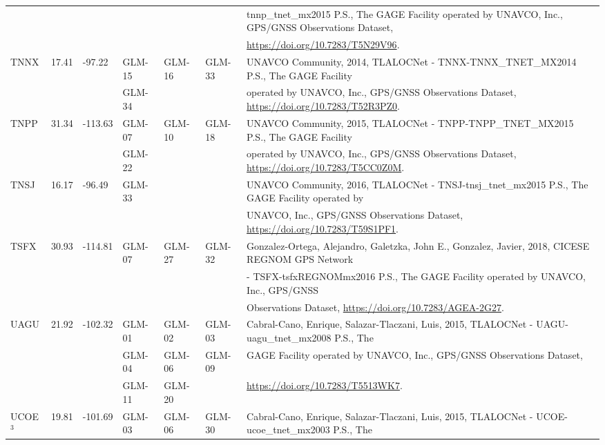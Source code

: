 \begin{landscape}
\begin{longtable}{llllllp{12cm}}
    &&&&&& tnnp\_tnet\_mx2015 P.S., The GAGE Facility operated by UNAVCO, Inc., GPS/GNSS Observations Dataset, \\
    &&&&&& \url{https://doi.org/10.7283/T5N29V96}. \\\hline
    \multirow{2}{*}{TNNX} & \multirow{2}{*}{17.41} & \multirow{2}{*}{-97.22} & GLM-15 & GLM-16 & GLM-33  & UNAVCO Community, 2014, TLALOCNet - TNNX-TNNX\_TNET\_MX2014 P.S., The GAGE Facility \\
    &&& GLM-34 &&& operated by UNAVCO, Inc., GPS/GNSS Observations Dataset, \url{https://doi.org/10.7283/T52R3PZ0}.\\\hline
    \multirow{2}{*}{TNPP} & \multirow{2}{*}{31.34} & \multirow{2}{*}{-113.63} & GLM-07 & GLM-10 & GLM-18 & UNAVCO Community, 2015, TLALOCNet - TNPP-TNPP\_TNET\_MX2015 P.S., The GAGE Facility \\
    &&& GLM-22 &&& operated by UNAVCO, Inc., GPS/GNSS Observations Dataset, \url{https://doi.org/10.7283/T5CC0Z0M}.\\\hline
    \multirow{2}{*}{TNSJ} & \multirow{2}{*}{16.17} & \multirow{2}{*}{-96.49} & \multirow{2}{*}{GLM-33} & & & UNAVCO Community, 2016, TLALOCNet - TNSJ-tnsj\_tnet\_mx2015 P.S., The GAGE Facility operated by \\
    &&&&&& UNAVCO, Inc., GPS/GNSS Observations Dataset, \url{https://doi.org/10.7283/T59S1PF1}.\\\hline
    \multirow{3}{*}{TSFX} & \multirow{3}{*}{30.93} & \multirow{3}{*}{-114.81} & \multirow{3}{*}{GLM-07} & \multirow{3}{*}{GLM-27} & \multirow{3}{*}{GLM-32} & Gonzalez-Ortega, Alejandro, Galetzka, John E., Gonzalez, Javier, 2018, CICESE REGNOM GPS Network \\
    &&&&&& - TSFX-tsfxREGNOMmx2016 P.S., The GAGE Facility operated by UNAVCO, Inc., GPS/GNSS \\
    &&&&&& Observations Dataset, \url{https://doi.org/10.7283/AGEA-2G27}.\\\hline
    \multirow{3}{*}{UAGU} & \multirow{3}{*}{21.92} & \multirow{3}{*}{-102.32} & GLM-01 & GLM-02 & GLM-03  & Cabral-Cano, Enrique, Salazar-Tlaczani, Luis, 2015, TLALOCNet - UAGU-uagu\_tnet\_mx2008 P.S., The \\
    &&& GLM-04 & GLM-06 & GLM-09 & GAGE Facility operated by UNAVCO, Inc., GPS/GNSS Observations Dataset, \\
    &&& GLM-11 & GLM-20 &        & \url{https://doi.org/10.7283/T5513WK7}.\\\hline
    \multirow{3}{*}{UCOE\hyperlink{Graham}{${}^3$}} & \multirow{3}{*}{19.81} & \multirow{3}{*}{-101.69} & GLM-03 & GLM-06 & GLM-30 & Cabral-Cano, Enrique, Salazar-Tlaczani, Luis, 2015, TLALOCNet - UCOE-ucoe\_tnet\_mx2003 P.S., The \\

\end{longtable}
\end{landscape}
